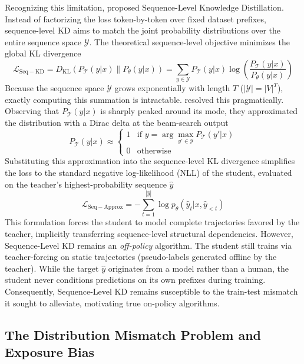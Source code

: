 \documentclass{article} %
\newcommand{\KL}{D_{\mathrm{KL}}}
\newcommand{\ptheta}{p_\theta}
\newcommand{\loss}{\mathcal{L}}
\begin{document}
Recognizing this limitation, \citet{kim2016sequence} proposed Sequence-Level Knowledge Distillation. Instead of factorizing the loss token-by-token over fixed dataset prefixes, sequence-level KD aims to match the joint probability distributions over the entire sequence space $\mathcal{Y}$. The theoretical sequence-level objective minimizes the global KL divergence
\begin{equation}
    \loss_{\mathrm{Seq-KD}} = \KL(P_{\mathcal{T}}(y | x) \parallel P_{\theta}(y | x)) = \sum_{y \in \mathcal{Y}} P_{\mathcal{T}}(y | x) \log \left( \frac{P_{\mathcal{T}}(y | x)}{P_{\theta}(y | x)} \right)
\end{equation}
Because the sequence space $\mathcal{Y}$ grows exponentially with length $T$ ($|\mathcal{Y}| = |V|^T$), exactly computing this summation is intractable. \citet{kim2016sequence} resolved this pragmatically. Observing that $P_{\mathcal{T}}(y|x)$ is sharply peaked around its mode, they approximated the distribution with a Dirac delta at the beam-search output
\begin{equation}
    P_{\mathcal{T}}(y | x) \approx \begin{cases} 
      1 & \text{if } y = \arg\max_{y' \in \mathcal{Y}} P_{\mathcal{T}}(y' | x) \\
      0 & \text{otherwise} 
   \end{cases}
\end{equation}
Substituting this approximation into the sequence-level KL divergence simplifies the loss to the standard negative log-likelihood (NLL) of the student, evaluated on the teacher's highest-probability sequence $\hat{y}$
\begin{equation}
    \loss_{\mathrm{Seq-Approx}} = - \sum_{t=1}^{|\hat{y}|} \log \ptheta(\hat{y}_t | x, \hat{y}_{<t})
\end{equation}
This formulation forces the student to model complete trajectories favored by the teacher, implicitly transferring sequence-level structural dependencies. However, Sequence-Level KD remains an \textit{off-policy} algorithm. The student still trains via teacher-forcing on static trajectories (pseudo-labels generated offline by the teacher). While the target $\hat{y}$ originates from a model rather than a human, the student never conditions predictions on its own prefixes during training. Consequently, Sequence-Level KD remains susceptible to the train-test mismatch it sought to alleviate, motivating true on-policy algorithms.

\subsection{The Distribution Mismatch Problem and Exposure Bias}
\label{subsec:exposure_bias}
\end{document}
